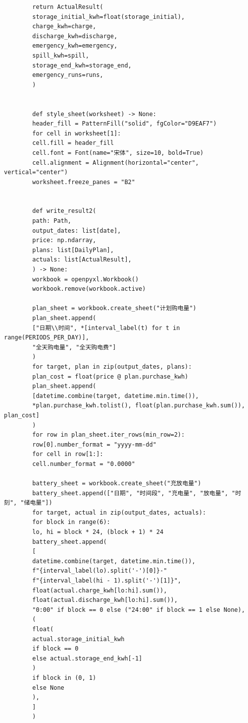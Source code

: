 \documentclass[UTF8]{ctexart}
\begin{document}
\begin{verbatim}
        return ActualResult(
        storage_initial_kwh=float(storage_initial),
        charge_kwh=charge,
        discharge_kwh=discharge,
        emergency_kwh=emergency,
        spill_kwh=spill,
        storage_end_kwh=storage_end,
        emergency_runs=runs,
        )
        
        
        def style_sheet(worksheet) -> None:
        header_fill = PatternFill("solid", fgColor="D9EAF7")
        for cell in worksheet[1]:
        cell.fill = header_fill
        cell.font = Font(name="宋体", size=10, bold=True)
        cell.alignment = Alignment(horizontal="center", vertical="center")
        worksheet.freeze_panes = "B2"
        
        
        def write_result2(
        path: Path,
        output_dates: list[date],
        price: np.ndarray,
        plans: list[DailyPlan],
        actuals: list[ActualResult],
        ) -> None:
        workbook = openpyxl.Workbook()
        workbook.remove(workbook.active)
        
        plan_sheet = workbook.create_sheet("计划购电量")
        plan_sheet.append(
        ["日期\\时间", *[interval_label(t) for t in range(PERIODS_PER_DAY)],
        "全天购电量", "全天购电费"]
        )
        for target, plan in zip(output_dates, plans):
        plan_cost = float(price @ plan.purchase_kwh)
        plan_sheet.append(
        [datetime.combine(target, datetime.min.time()),
        *plan.purchase_kwh.tolist(), float(plan.purchase_kwh.sum()), plan_cost]
        )
        for row in plan_sheet.iter_rows(min_row=2):
        row[0].number_format = "yyyy-mm-dd"
        for cell in row[1:]:
        cell.number_format = "0.0000"
        
        battery_sheet = workbook.create_sheet("充放电量")
        battery_sheet.append(["日期", "时间段", "充电量", "放电量", "时刻", "储电量"])
        for target, actual in zip(output_dates, actuals):
        for block in range(6):
        lo, hi = block * 24, (block + 1) * 24
        battery_sheet.append(
        [
        datetime.combine(target, datetime.min.time()),
        f"{interval_label(lo).split('-')[0]}-"
        f"{interval_label(hi - 1).split('-')[1]}",
        float(actual.charge_kwh[lo:hi].sum()),
        float(actual.discharge_kwh[lo:hi].sum()),
        "0:00" if block == 0 else ("24:00" if block == 1 else None),
        (
        float(
        actual.storage_initial_kwh
        if block == 0
        else actual.storage_end_kwh[-1]
        )
        if block in (0, 1)
        else None
        ),
        ]
        )
        

\end{verbatim}
\end{document}
